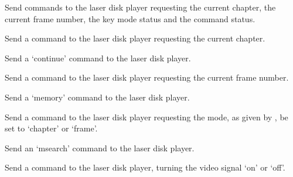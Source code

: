   
  
  
  
  
  
  
  
  \objListIOEnd






\objItemCommands[]

  \objListCmdBegin
  
  Send commands to the laser disk player requesting the current chapter, the current frame number,
  the key mode status and the command status.
  
  Send a command to the laser disk player requesting the current chapter.
  
  Send a `continue' command to the laser disk player.
  
  Send a command to the laser disk player requesting the current frame number.
  
  Send a `memory' command to the laser disk player.
  
  Send a command to the laser disk player requesting the mode, as given by , be
  set to `chapter' or `frame'.
  
  Send an `msearch' command to the laser disk player.
  
  Send a command to the laser disk player, turning the video signal `on' or `off'.
  
